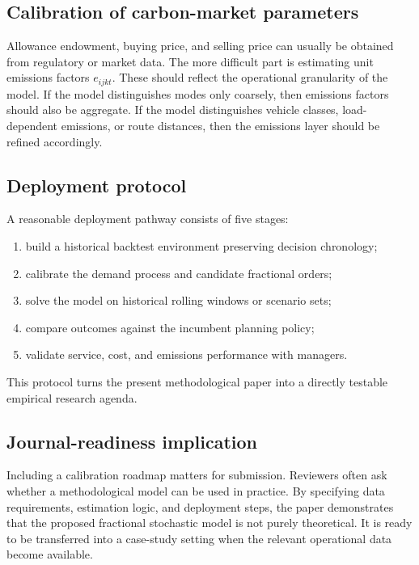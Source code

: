 \subsection{Calibration of carbon-market parameters}
Allowance endowment, buying price, and selling price can usually be obtained from regulatory or market data. The more difficult part is estimating unit emissions factors $e_{ijkt}$. These should reflect the operational granularity of the model. If the model distinguishes modes only coarsely, then emissions factors should also be aggregate. If the model distinguishes vehicle classes, load-dependent emissions, or route distances, then the emissions layer should be refined accordingly.

\subsection{Deployment protocol}
A reasonable deployment pathway consists of five stages:
\begin{enumerate}[label=\textbf{P\arabic*.},leftmargin=2.0em]
    \item build a historical backtest environment preserving decision chronology;
    \item calibrate the demand process and candidate fractional orders;
    \item solve the model on historical rolling windows or scenario sets;
    \item compare outcomes against the incumbent planning policy;
    \item validate service, cost, and emissions performance with managers.
\end{enumerate}
This protocol turns the present methodological paper into a directly testable empirical research agenda.

\subsection{Journal-readiness implication}
Including a calibration roadmap matters for submission. Reviewers often ask whether a methodological model can be used in practice. By specifying data requirements, estimation logic, and deployment steps, the paper demonstrates that the proposed fractional stochastic model is not purely theoretical. It is ready to be transferred into a case-study setting when the relevant operational data become available.